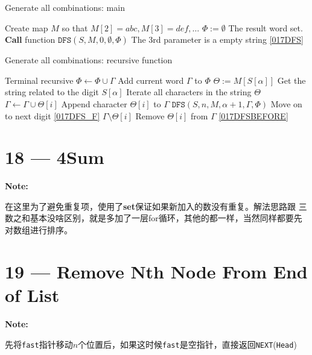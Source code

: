 \documentclass[a4paper,12pt]{article}
\begin{document}
\setcounter{algorithm}{0}
\begin{algorithm}[H]
\caption{Generate all combinations: main}
\begin{algorithmic}[1]
\Statex
{}
\State Create map $M$ so that $M[2]=abc, M[3] = def, \ldots$
\State $\Phi := \emptyset$ \Comment The result word set.
\State \textbf{Call} function $\mathtt{DFS}(S, M, 0, \emptyset, \Phi)$ \Comment The 3rd parameter is a empty string \ref{017DFS}
\EndProcedure
\Statex
\end{algorithmic}
\end{algorithm}

\begin{algorithm}[H]
\caption{Generate all combinations: recursive function}
\label{017DFS}
\begin{algorithmic}[1]
\Statex
{} \label{017DFS_F}
 \Comment Terminal recursive
\State $\Phi \gets \Phi \cup \Gamma$ \Comment Add current word $\Gamma$ to $\Phi$
\Else
\State $\Theta := M[S[\alpha]]$ \Comment Get the string related to the digit $S[\alpha]$
 \Comment Iterate all characters in the string $\Theta$
\State $\Gamma \gets \Gamma \cup \Theta[i]$ \Comment Append character $\Theta[i]$ to $\Gamma$ \label{017DFSBEFORE}
\State $\mathtt{DFS}(S, n, M, \alpha + 1, \Gamma, \Phi)$ \Comment Move on to next digit \ref{017DFS_F}
\State $\Gamma \setminus \Theta[i]$ \Comment Remove $\Theta[i]$ from $\Gamma$ \ref{017DFSBEFORE}
\EndFor
\EndIf
\EndProcedure
\Statex
\end{algorithmic}
\end{algorithm}

\section{18 --- 4Sum}
\textbf{\large{Note:}}
\begin{CJK*}{UTF8}{gbsn}
在这里为了避免重复项，使用了\textbf{set}保证如果新加入的数没有重复。解法思路跟 三数之和基本没啥区别，就是多加了一层for循环，其他的都一样，当然同样都要先对数组进行排序。
\clearpage
\end{CJK*}

\section{19 --- Remove Nth Node From End of List}
\textbf{\large{Note:}}
\begin{CJK*}{UTF8}{gbsn}
先将\texttt{fast}指针移动$n$个位置后，如果这时候\texttt{fast}是空指针，直接返回\texttt{NEXT}(\texttt{Head})
\clearpage
\end{CJK*}
\end{document}
